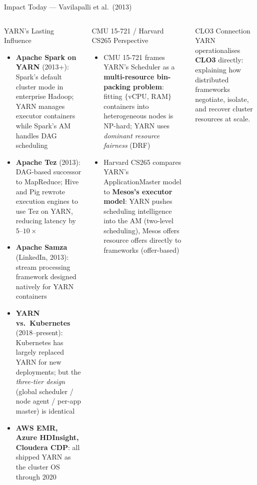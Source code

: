 \documentclass[aspectratio=169,10pt]{beamer}
\begin{document}
\begin{frame}{Impact Today — Vavilapalli et al.\ (2013)}
  \begin{columns}[T]
      \begin{block}{YARN's Lasting Influence}
        \begin{itemize}
          \item \textbf{Apache Spark on YARN} (2013+): Spark's default
                cluster mode in enterprise Hadoop; YARN manages executor
                containers while Spark's AM handles DAG scheduling
          \item \textbf{Apache Tez} (2013): DAG-based successor to
                MapReduce; Hive and Pig rewrote execution engines to
                use Tez on YARN, reducing latency by $5\text{--}10\times$
          \item \textbf{Apache Samza} (LinkedIn, 2013): stream processing
                framework designed natively for YARN containers
          \item \textbf{YARN vs.\ Kubernetes} (2018--present):
                Kubernetes has largely replaced YARN for new deployments;
                but the \emph{three-tier design} (global scheduler /
                node agent / per-app master) is identical
          \item \textbf{AWS EMR, Azure HDInsight, Cloudera CDP}:
                all shipped YARN as the cluster OS through 2020
        \end{itemize}
      \end{block}

      \begin{exampleblock}{CMU 15-721 / Harvard CS265 Perspective}
        \begin{itemize}
          \item CMU 15-721 frames YARN's Scheduler as a
                \textbf{multi-resource bin-packing problem}:
                fitting $\{$vCPU, RAM$\}$ containers into
                heterogeneous nodes is NP-hard; YARN uses
                \emph{dominant resource fairness} (DRF)
          \item Harvard CS265 compares YARN's ApplicationMaster
                model to \textbf{Mesos's executor model}:
                YARN pushes scheduling intelligence into the AM
                (two-level scheduling), Mesos offers resource
                offers directly to frameworks (offer-based)
        \end{itemize}
      \end{exampleblock}
      \vspace{5pt}
      \begin{alertblock}{CLO3 Connection}
        YARN operationalises \textbf{CLO3} directly:
        explaining how distributed frameworks negotiate,
        isolate, and recover cluster resources at scale.
      \end{alertblock}
  \end{columns}
\end{frame}
\end{document}
